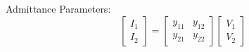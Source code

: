 \begin{multicols}{2}
\begin{CheatsheetEntryFrame}
        Admittance Parameters:
        \begin{equation*}
            \begin{bmatrix}
                I_1 \\
                I_2
            \end{bmatrix}
            =
            \begin{bmatrix}
                y_{11} & y_{12} \\
                y_{21} & y_{22}
            \end{bmatrix}
            \begin{bmatrix}
                V_1 \\
                V_2
            \end{bmatrix}
        \end{equation*}


\end{CheatsheetEntryFrame}
\end{multicols}
